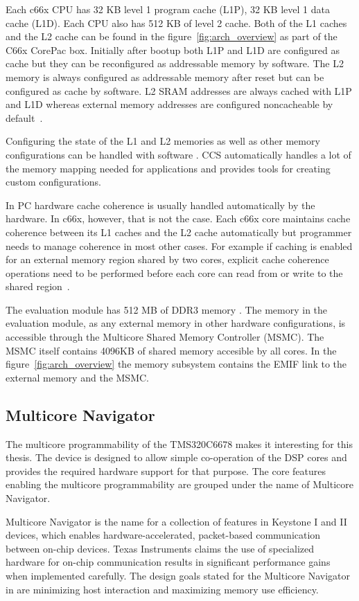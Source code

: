 Each c66x CPU has 32 KB level 1 program cache (L1P), 32 KB level 1 data cache (L1D). Each CPU also has 512 KB of level 2 cache. Both of the L1 caches and the L2 cache can be found in the figure~\ref{fig:arch_overview} as part of the C66x CorePac box. Initially after bootup both L1P and L1D are configured as cache but they can be reconfigured as addressable memory by software. The L2 memory is always configured as addressable memory after reset but can be configured as cache by software. \cite{tmsdatasheet} L2 SRAM addresses are always cached with L1P and L1D whereas external memory addresses are configured noncacheable by default~\cite{cacheguide}.

Configuring the state of the L1 and L2 memories as well as other memory configurations can be handled with software \cite{sprugh7}. CCS automatically handles a lot of the memory mapping needed for applications and provides tools for creating custom configurations.

In PC hardware cache coherence is usually handled automatically by the hardware. In c66x, however, that is not the case. Each c66x core maintains cache coherence between its L1 caches and the L2 cache automatically but programmer needs to manage coherence in most other cases. For example if caching is enabled for an external memory region shared by two cores, explicit cache coherence operations need to be performed before each core can read from or write to the shared region~\cite{cacheguide}.

The evaluation module has 512 MB of DDR3 memory \cite{evmref}. The memory in the evaluation module, as any external memory in other hardware configurations, is accessible through the Multicore Shared Memory Controller (MSMC). The MSMC itself contains 4096KB of shared memory accesible by all cores. In the figure~\ref{fig:arch_overview} the memory subsystem contains the EMIF link to the external memory and the MSMC.

\subsection{Multicore Navigator}
\label{subsec:multicorenav}
The multicore programmability of the TMS320C6678 makes it interesting for this thesis. The device is designed to allow simple co-operation of the DSP cores and provides the required hardware support for that purpose. The core features enabling the multicore programmability are grouped under the name of Multicore Navigator.

Multicore Navigator is the name for a collection of features in Keystone I and II devices, which enables hardware-accelerated, packet-based communication between on-chip devices. Texas Instruments claims the use of specialized hardware for on-chip communication results in significant performance gains when implemented carefully. The design goals stated for the Multicore Navigator in \cite{navigator} are minimizing host interaction and maximizing memory use efficiency.~\cite{navigator}


